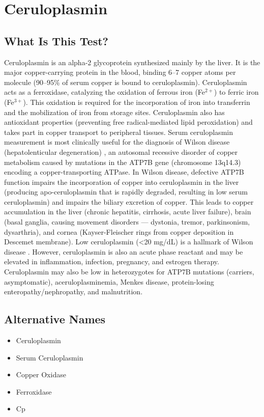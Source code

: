 \chapter{Ceruloplasmin}
\section*{What Is This Test?}
Ceruloplasmin is an alpha-2 glycoprotein synthesized mainly by the liver. It is the major copper-carrying protein in the blood, binding 6--7 copper atoms per molecule (90--95\% of serum copper is bound to ceruloplasmin). Ceruloplasmin acts as a ferroxidase, catalyzing the oxidation of ferrous iron (Fe$^{2+}$) to ferric iron (Fe$^{3+}$). This oxidation is required for the incorporation of iron into transferrin and the mobilization of iron from storage sites. Ceruloplasmin also has antioxidant properties (preventing free radical-mediated lipid peroxidation) and takes part in copper transport to peripheral tissues. Serum ceruloplasmin measurement is most clinically useful for the diagnosis of Wilson disease (hepatolenticular degeneration) \cite{roberts2008diagnosis}, an autosomal recessive disorder of copper metabolism caused by mutations in the ATP7B gene (chromosome 13q14.3) encoding a copper-transporting ATPase. In Wilson disease, defective ATP7B function impairs the incorporation of copper into ceruloplasmin in the liver (producing apo-ceruloplasmin that is rapidly degraded, resulting in low serum ceruloplasmin) and impairs the biliary excretion of copper. This leads to copper accumulation in the liver (chronic hepatitis, cirrhosis, acute liver failure), brain (basal ganglia, causing movement disorders --- dystonia, tremor, parkinsonism, dysarthria), and cornea (Kayser-Fleischer rings from copper deposition in Descemet membrane). Low ceruloplasmin (<20 mg/dL) is a hallmark of Wilson disease \cite{brewer2001wilsons}. However, ceruloplasmin is also an acute phase reactant and may be elevated in inflammation, infection, pregnancy, and estrogen therapy. Ceruloplasmin may also be low in heterozygotes for ATP7B mutations (carriers, asymptomatic), aceruloplasminemia, Menkes disease, protein-losing enteropathy/nephropathy, and malnutrition.
\section*{Alternative Names}
\begin{itemize}
  \item Ceruloplasmin
  \item Serum Ceruloplasmin
  \item Copper Oxidase
  \item Ferroxidase
  \item Cp
\end{itemize}
